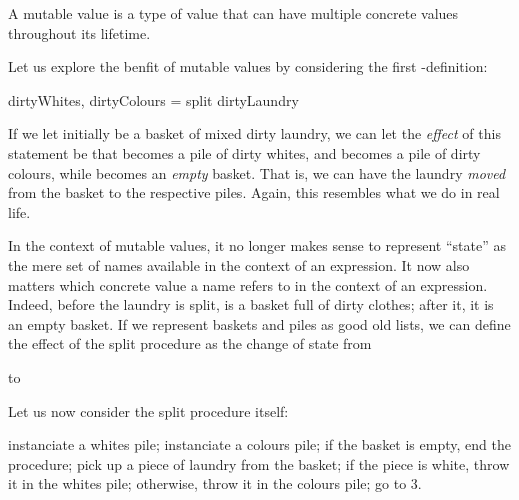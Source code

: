 \begin{definition}

A mutable value is a type of value that can have multiple concrete values
throughout its lifetime.

\end{definition}

Let us explore the benfit of mutable values by considering the first
-definition:

\begin{code}
dirtyWhites, dirtyColours = split dirtyLaundry
\end{code}

If we let  initially be a basket of mixed dirty laundry, we
can let the \emph{effect} of this statement be that  becomes a
pile of dirty whites, and  becomes a pile of dirty colours,
while  becomes an \emph{empty} basket. That is, we can have
the laundry \emph{moved} from the basket to the respective piles. Again, this
resembles what we do in real life.

In the context of mutable values, it no longer makes sense to represent
``state'' as the mere set of names available in the context of an expression.
It now also matters which concrete value a name refers to in the context of an
expression. Indeed, before the laundry is split,  is a basket
full of dirty clothes; after it, it is an empty basket. If we represent baskets
and piles as good old lists, we can define the effect of the split procedure as
the change of state from

\begin{codebox}
\end{codebox}

to

\begin{codebox}
\end{codebox}

Let us now consider the split procedure itself:

\begin{codebox}
\li instanciate a whites pile;
\li instanciate a colours pile;
\zi  
\li if the basket is empty, end the procedure;
\zi  
\li pick up a piece of laundry from the basket;
\li if the piece is white, throw it in the whites pile;
\li otherwise, throw it in the colours pile;
\zi  
\li go to 3.
\end{codebox}

